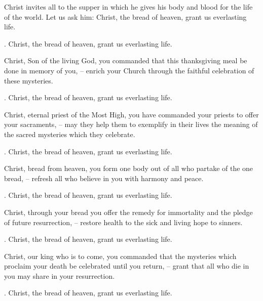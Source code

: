 \lettrine[loversize=0.15,lines=2]{C}{}hrist invites all to the supper in which he gives his body and blood for the life of the world. Let us ask him: Christ, the bread of heaven, grant us everlasting life.
\par \Rbar. Christ, the bread of heaven, grant us everlasting life.

Christ, Son of the living God, you commanded that this thanksgiving meal be done in memory of you,
– enrich your Church through the faithful celebration of these mysteries.
\par \Rbar. Christ, the bread of heaven, grant us everlasting life.

Christ, eternal priest of the Most High, you have commanded your priests to offer your sacraments,
– may they help them to exemplify in their lives the meaning of the sacred mysteries which they celebrate.
\par \Rbar. Christ, the bread of heaven, grant us everlasting life.

Christ, bread from heaven, you form one body out of all who partake of the one bread,
– refresh all who believe in you with harmony and peace.
\par \Rbar. Christ, the bread of heaven, grant us everlasting life.

Christ, through your bread you offer the remedy for immortality and the pledge of future resurrection,
– restore health to the sick and living hope to sinners.
\par \Rbar. Christ, the bread of heaven, grant us everlasting life.

Christ, our king who is to come, you commanded that the mysteries which proclaim your death be celebrated until you return,
– grant that all who die in you may share in your resurrection.
\par \Rbar. Christ, the bread of heaven, grant us everlasting life.
